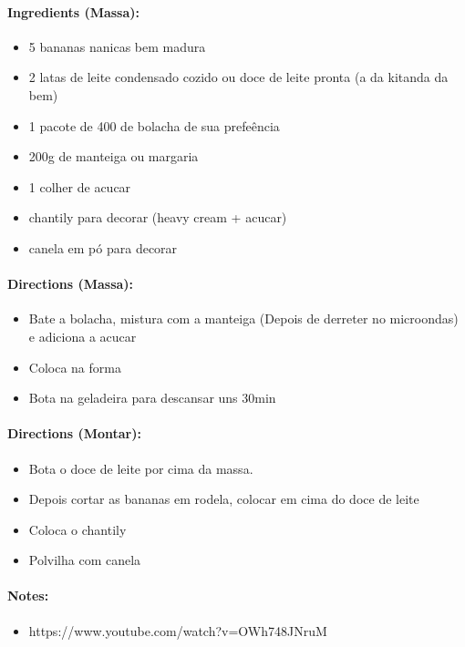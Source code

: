 \documentclass{article}
\begin{document}
\paragraph{Ingredients (Massa):}
\begin{itemize}
    \item 5 bananas nanicas bem madura
    \item 2 latas de leite condensado cozido ou doce de leite pronta (a da kitanda da bem)
    \item 1 pacote de 400 de bolacha de sua prefeência
    \item 200g de manteiga ou margaria
    \item 1 colher de acucar
    \item chantily para decorar (heavy cream + acucar)
    \item canela em pó para decorar
\end{itemize}    

\paragraph{Directions (Massa):}
\begin{itemize}
    \item Bate a bolacha, mistura com a manteiga (Depois de derreter no microondas) e adiciona a acucar
    \item Coloca na forma
    \item Bota na geladeira para descansar uns 30min
\end{itemize}  

\paragraph{Directions (Montar):}
\begin{itemize}
    \item Bota o doce de leite por cima da massa.
    \item Depois cortar as bananas em rodela, colocar em cima do doce de leite
    \item Coloca o chantily
    \item Polvilha com canela
\end{itemize} 

\paragraph{Notes:}
\begin{itemize}
    \item https://www.youtube.com/watch?v=OWh748JNruM
\end{itemize}
\end{document}
